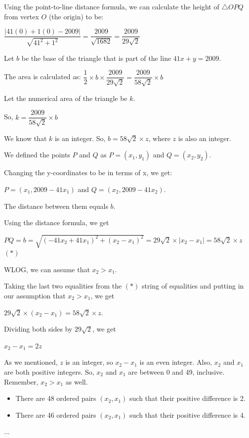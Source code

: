 \begin{enumerate}
 Using the point-to-line distance formula, we can calculate the height of $\triangle OPQ$ from vertex $O$ (the origin) to be:

 $\dfrac{|41(0) + 1(0) - 2009|}{\sqrt{41^2 + 1^2}} = \dfrac{2009}{\sqrt{1682}} = \dfrac{2009}{29\sqrt2}$

 Let $b$ be the base of the triangle that is part of the line $41x+y=2009$.

 The area is calculated as: $\dfrac{1}{2}\times b \times \dfrac{2009}{29\sqrt2} = \dfrac{2009}{58\sqrt2}\times b$

 Let the numerical area of the triangle be $k$. 

 So, $k = \dfrac{2009}{58\sqrt2}\times b$

 We know that $k$ is an integer. So, $b = 58\sqrt2 \times z$, where $z$ is also an integer.

 We defined the points $P$ and $Q$ as $P=(x_1,y_1)$ and $Q=(x_2,y_2)$.

 Changing the y-coordinates to be in terms of x, we get:

 $P=(x_1,2009-41x_1)$ and $Q=(x_2,2009-41x_2)$.

 The distance between them equals $b$. 

 Using the distance formula, we get

 $PQ = b = \sqrt{(-41x_2+ 41x_1)^2 + (x_2 - x_1)^2} = 29\sqrt2 \times |x_2 - x_1| = 58\sqrt2\times z$ $(*)$

 WLOG, we can assume that $x_2 > x_1$.

 Taking the last two equalities from the $(*)$ string of equalities and putting in our assumption that $x_2>x_1$, we get

 $29\sqrt2\times (x_2-x_1) = 58\sqrt2\times z$.

 Dividing both sides by $29\sqrt2$, we get

 $x_2-x_1 = 2z$

 As we mentioned, $z$ is an integer, so $x_2-x_1$ is an even integer. Also, $x_2$ and $x_1$ are both positive integers. So, $x_2$ and $x_1$ are between 0 and 49, inclusive. Remember, $x_2>x_1$ as well.

 
            \begin{itemize}
        \item There are 48 ordered pairs $(x_2,x_1)$ such that their positive difference is 2.
            \end{itemize}
            
            \begin{itemize}
        \item There are 46 ordered pairs $(x_2,x_1)$ such that their positive difference is 4.
            \end{itemize}
            ...


\end{enumerate}
